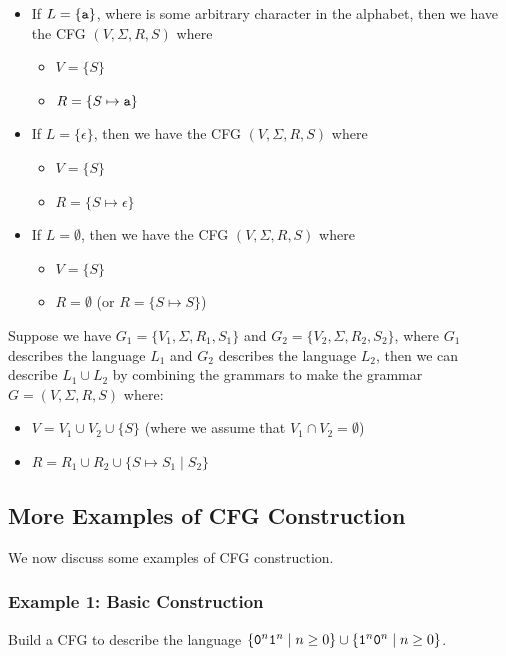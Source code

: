 \documentclass[letterpaper]{article}
\begin{document}
\begin{itemize}
    \item If $L = \{\texttt{a}\}$, where  is some arbitrary character in the alphabet, then we have the CFG $(V, \Sigma, R, S)$ where 
    \begin{itemize}
        \item $V = \{S\}$
        \item $R = \{S \mapsto \texttt{a}\}$
    \end{itemize}
    
    \item If $L = \{\epsilon\}$, then we have the CFG $(V, \Sigma, R, S)$ where 
    \begin{itemize}
        \item $V = \{S\}$
        \item $R = \{S \mapsto \epsilon\}$
    \end{itemize}
    
    \item If $L = \emptyset$, then we have the CFG $(V, \Sigma, R, S)$ where 
    \begin{itemize}
        \item $V = \{S\}$
        \item $R =  \emptyset$ (or $R = \{S \mapsto S\}$)
    \end{itemize} 
\end{itemize}
Suppose we have $G_1 = \{V_1, \Sigma, R_1, S_1\}$ and $G_2 = \{V_2, \Sigma, R_2, S_2\}$, where $G_1$ describes the language $L_1$ and $G_2$ describes the language $L_2$, then we can describe $L_1 \cup L_2$ by combining the grammars to make the grammar $G = (V, \Sigma, R, S)$ where:
\begin{itemize}
    \item $V = V_1 \cup V_2 \cup \{S\}$ (where we assume that $V_1 \cap V_2 = \emptyset$)
    \item $R = R_1 \cup R_2 \cup \{S \mapsto S_1 \mid S_2\}$
\end{itemize}

\subsection{More Examples of CFG Construction}
We now discuss some examples of CFG construction.

\subsubsection{Example 1: Basic Construction}
Build a CFG to describe the language $\{\texttt{0}^n \texttt{1}^n \mid n \geq 0\} \cup \{\texttt{1}^n \texttt{0}^n \mid n \geq 0\}$. 
\end{document}

